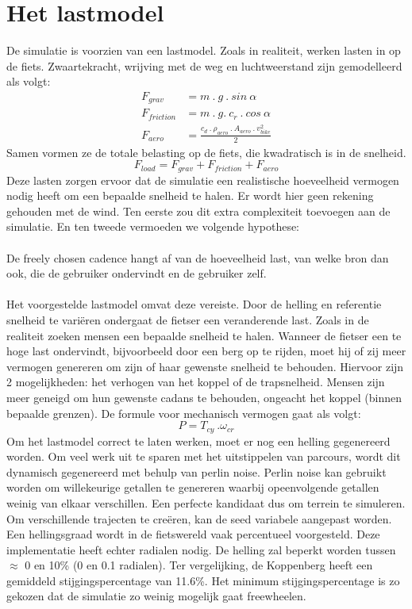\documentclass[12pt,a4paper,oneside]{book}
\newcommand\tab[1][1cm]{\hspace*{#1}}
\begin{document}
\section{Het lastmodel}
De simulatie is voorzien van een lastmodel. Zoals in realiteit, werken lasten in op de fiets. Zwaartekracht, wrijving met de weg en luchtweerstand zijn gemodelleerd als volgt:
\\
\begin{align*}
F_{grav}&=m \ . \ g \ . \ sin \ \alpha \\
F_{friction}&=m \ . \ g. \ c_r \ . \ cos \ \alpha \\
F_{aero}&=\frac{c_d \ . \ \rho_{aero} \ . \ A_{aero} \ . \ v_{bike}^2}{2}
\end{align*}
Samen vormen ze de totale belasting op de fiets, die kwadratisch is in de snelheid.
\[F_{load} = F_{grav}+F_{friction}+F_{aero}\]
Deze lasten zorgen ervoor dat de simulatie een realistische hoeveelheid vermogen nodig heeft om een bepaalde snelheid te halen. Er wordt hier geen rekening gehouden met de wind. Ten eerste zou dit extra complexiteit toevoegen aan de simulatie. En ten tweede vermoeden we volgende hypothese:
\\\\
\tab De freely chosen cadence hangt af van de hoeveelheid last, van welke bron dan \tab ook, die de gebruiker ondervindt en de gebruiker zelf.
\\\\
Het voorgestelde lastmodel omvat deze vereiste. Door de helling en referentie snelheid te variëren ondergaat de fietser een veranderende last. Zoals in de realiteit zoeken mensen een bepaalde snelheid te halen. Wanneer de fietser een te hoge last ondervindt, bijvoorbeeld door een berg op te rijden, moet hij of zij meer vermogen genereren om zijn of haar gewenste snelheid te behouden. Hiervoor zijn 2 mogelijkheden: het verhogen van het koppel of de trapsnelheid. Mensen zijn meer geneigd om hun gewenste cadans te behouden, ongeacht het koppel (binnen bepaalde grenzen). De formule voor mechanisch vermogen gaat als volgt:
\[P=T_{cy} \ . \omega_{cr} \]
Om het lastmodel correct te laten werken, moet er nog een helling gegenereerd worden. Om veel werk uit te sparen met het uitstippelen van parcours, wordt dit dynamisch gegenereerd met behulp van perlin noise. Perlin noise kan gebruikt worden om willekeurige getallen te genereren waarbij opeenvolgende getallen weinig van elkaar verschillen. Een perfecte kandidaat dus om terrein te simuleren. Om verschillende trajecten te creëren, kan de seed variabele aangepast worden. Een hellingsgraad wordt in de fietswereld vaak percentueel voorgesteld. Deze implementatie heeft echter radialen nodig. De helling zal beperkt worden tussen $\approx$ 0 en 10\% (0 en 0.1 radialen). Ter vergelijking, de Koppenberg heeft een gemiddeld stijgingspercentage van 11.6\%. Het minimum stijgingspercentage is zo gekozen dat de simulatie zo weinig mogelijk gaat freewheelen.
\end{document}
